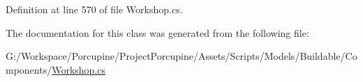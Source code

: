 Definition at line 570 of file Workshop.\+cs.



The documentation for this class was generated from the following file\+:\begin{DoxyCompactItemize}
\item 
G\+:/\+Workspace/\+Porcupine/\+Project\+Porcupine/\+Assets/\+Scripts/\+Models/\+Buildable/\+Components/\hyperlink{_workshop_8cs}{Workshop.\+cs}\end{DoxyCompactItemize}
